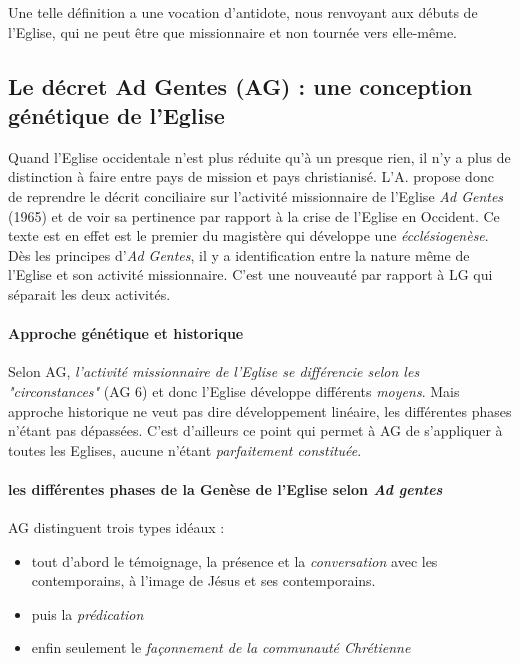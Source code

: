 Une telle définition a une vocation d'antidote, nous renvoyant aux débuts de l'Eglise, qui ne peut être que missionnaire et non tournée vers elle-même. 

\subsection{Le décret Ad Gentes (AG) : une conception génétique de l'Eglise} Quand l'Eglise occidentale n'est plus réduite qu'à un presque rien, il n'y a plus de distinction à faire entre pays de mission et pays christianisé. L'A. propose donc de reprendre le décrit conciliaire sur l'activité missionnaire de l'Eglise \textit{Ad Gentes} (1965) et de voir sa pertinence par rapport à la crise de l'Eglise en Occident. 
Ce texte est en effet est le premier du magistère qui développe une \textit{écclésiogenèse}. Dès les principes d'\textit{Ad Gentes}, il y a identification entre la nature même de l'Eglise et son activité missionnaire.  C'est une nouveauté par rapport à LG qui séparait les deux activités. 

\paragraph{Approche génétique et historique } Selon AG, \textit{l'activité missionnaire de l'Eglise se différencie selon les "circonstances"} (AG 6) et donc l'Eglise développe différents \textit{moyens}. Mais approche historique ne veut pas dire développement linéaire, les différentes phases n'étant pas dépassées. C'est d'ailleurs ce point qui permet à AG de s'appliquer à toutes les Eglises, aucune n'étant \textit{parfaitement constituée}.

\paragraph{les différentes phases de la Genèse de l'Eglise selon \textit{Ad gentes}} AG distinguent trois types idéaux : 
\begin{itemize}
    \item tout d'abord le témoignage, la présence et la \textit{conversation} avec les contemporains, à l'image de Jésus et ses contemporains.
    \item puis la \textit{prédication}
    \item enfin seulement le \textit{façonnement de la communauté Chrétienne}
    
\end{itemize}

